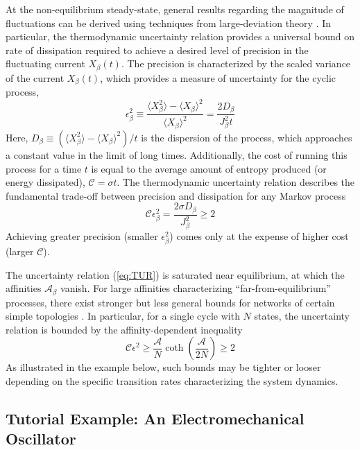 \begin{appendices}
At the non-equilibrium steady-state, general results regarding the magnitude of fluctuations can be derived using techniques from large-deviation theory \autocite{Touchette2009}. In particular, the thermodynamic uncertainty relation \autocite{Barato2015,Gingrich2016} provides a universal bound on rate of dissipation required to achieve a desired level of precision in the fluctuating current $X_{\beta}(t)$. The precision is characterized by the scaled variance of the current $X_{\beta}(t)$, which provides a measure of uncertainty for the cyclic process,
\begin{equation}
    \epsilon^2_{\beta} \equiv \frac{\langle X_{\beta}^2 \rangle -\langle X_{\beta} \rangle^2 }{\langle X_{\beta} \rangle^2} = \frac{2 D_{\beta}}{J^2_{\beta} t}
\end{equation}
Here, $D_{\beta}\equiv ( \langle X_{\beta}^2 \rangle -\langle X_{\beta} \rangle^2) / t$ is the dispersion of the process, which approaches a constant value in the limit of long times.  Additionally, the cost of running this process for a time $t$ is equal to the average amount of entropy produced (or energy dissipated), $\mathcal{C} = \sigma t$. The thermodynamic uncertainty relation describes the fundamental trade-off between precision and dissipation for any Markov process
\begin{equation}
     \mathcal{C}\epsilon^2_{\beta} = \frac{2\sigma D_{\beta}}{J_{\beta}^2} \geq 2 \label{eq:TUR}
\end{equation}
Achieving greater precision (smaller $\epsilon_{\beta}^2$) comes only at the expense of higher cost (larger $\mathcal{C}$).  

The uncertainty relation (\ref{eq:TUR}) is saturated near equilibrium, at which the affinities $\mathcal{A}_{\beta}$ vanish. For large affinities characterizing ``far-from-equilibrium'' processes, there exist stronger but less general bounds for networks of certain simple topologies \autocite{Pietzonka2016b}.  In particular, for a single cycle with $N$ states, the uncertainty relation is bounded by the affinity-dependent inequality  
\begin{equation}
    \mathcal{C}\epsilon^2 \geq \frac{\mathcal{A}}{N}\coth\left(\frac{\mathcal{A}}{2N}\right) \geq 2 \label{eq:unicycle}
\end{equation}
As illustrated in the example below, such bounds may be tighter or looser depending on the specific transition rates characterizing the system dynamics. 

\subsection{Tutorial Example: An Electromechanical Oscillator}


\end{appendices}
